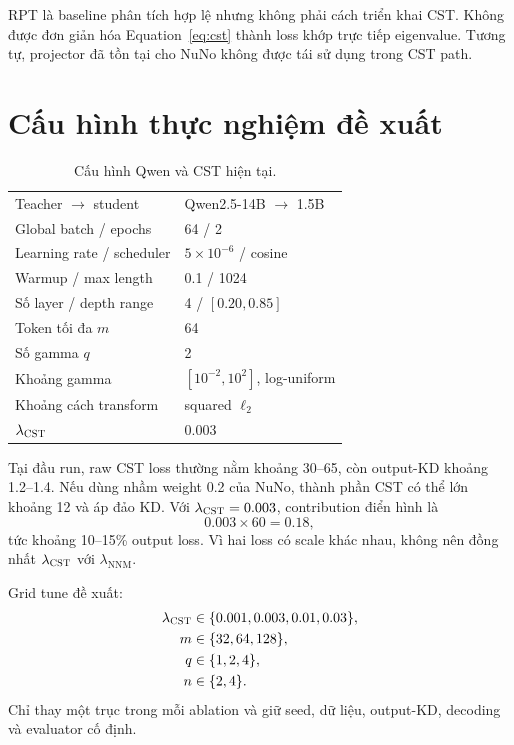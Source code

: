 \documentclass{article}
\newcommand{\cst}{\textsc{CST}}
\begin{document}
RPT là baseline phân tích hợp lệ nhưng không phải cách triển khai CST.  Không
được đơn giản hóa Equation~\ref{eq:cst} thành loss khớp trực tiếp eigenvalue.
Tương tự, projector đã tồn tại cho NuNo không được tái sử dụng trong CST path.

\section{Cấu hình thực nghiệm đề xuất}

\begin{table}[t]
\caption{Cấu hình Qwen và CST hiện tại.}
\label{tab:config}
\centering
\small
\begin{tabular}{ll}
\toprule
Teacher $\rightarrow$ student & Qwen2.5-14B $\rightarrow$ 1.5B\\
Global batch / epochs & 64 / 2\\
Learning rate / scheduler & $5\times10^{-6}$ / cosine\\
Warmup / max length & 0.1 / 1024\\
Số layer / depth range & 4 / $[0.20,0.85]$\\
Token tối đa $m$ & 64\\
Số gamma $q$ & 2\\
Khoảng gamma & $[10^{-2},10^2]$, log-uniform\\
Khoảng cách transform & squared $\ell_2$\\
$\lambda_{\cst}$ & 0.003\\
\bottomrule
\end{tabular}
\end{table}

Tại đầu run, raw CST loss thường nằm khoảng 30--65, còn output-KD khoảng
1.2--1.4.  Nếu dùng nhầm weight 0.2 của NuNo, thành phần CST có thể lớn khoảng
12 và áp đảo KD.  Với $\lambda_{\cst}=0.003$, contribution điển hình là
\begin{equation}
 0.003\times60=0.18,
\end{equation}
tức khoảng 10--15\% output loss.  Vì hai loss có scale khác nhau, không nên
đồng nhất $\lambda_{\cst}$ với $\lambda_{\mathrm{NNM}}$.

Grid tune đề xuất:
\begin{align}
 \lambda_{\cst}&\in\{0.001,0.003,0.01,0.03\},\\
 m&\in\{32,64,128\},\\
 q&\in\{1,2,4\},\\
 n&\in\{2,4\}.
\end{align}
Chỉ thay một trục trong mỗi ablation và giữ seed, dữ liệu, output-KD, decoding
và evaluator cố định.
\end{document}
